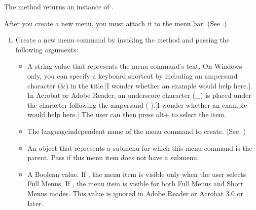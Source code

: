 \documentclass[letterpaper,12pt,english,openany,oneside]{sphinxmanual}
\begin{document}
The  method returns an instance of .

\begin{sphinxVerbatim}[commandchars=\\\{\}]
     
\end{sphinxVerbatim}

After you create a new menu, you must attach it to the menu bar. (See .)
\begin{enumerate}
%
\setcounter{enumi}{3}
\item {} 
Create a new menu command by invoking the  method and passing the following arguments:
\begin{itemize}
\item {} 
A string value that represents the menu command’s text. On Windows only, you can specify a keyboard shortcut by including an ampersand character (\&) in the title.{[}I wonder whether an example would help here.{]} In Acrobat or Adobe Reader, an underscore character (\_) is placed under the character following the ampersand (  ).{[}I wonder whether an example would help here.{]} The user can then press alt+  to select the item.

\item {} 
The language\sphinxhyphen{}independent name of the menu command to create. (See .)

\item {} 
An  object that represents a submenu for which this menu command is the parent. Pass  if this menu item does not have a submenu.

\item {} 
A Boolean value. If , the menu item is visible only when the user selects Full Menus. If , the menu item is visible for both Full Menus and Short Menus modes. This value is ignored in Adobe Reader or Acrobat 3.0 or later.


\end{itemize}
\end{enumerate}
\end{document}
